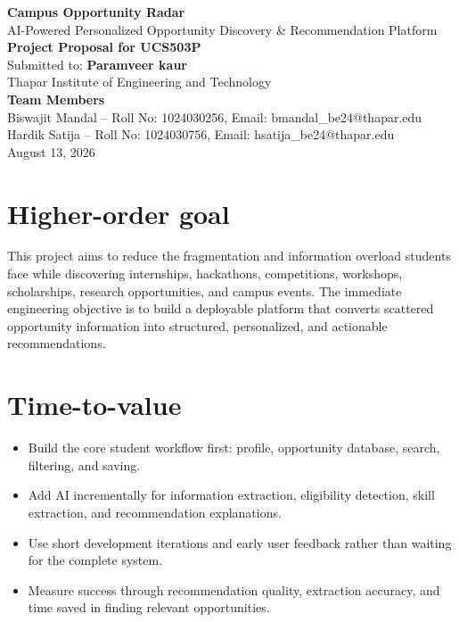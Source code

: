 \documentclass[11pt,a4paper]{article}
\begin{document}
\begin{center}
{\LARGE\bfseries Campus Opportunity Radar}\\[3pt]
{\large AI-Powered Personalized Opportunity Discovery \& Recommendation Platform}\\[6pt]
\textbf{Project Proposal for UCS503P}\\
Submitted to: \textbf{Paramveer kaur}\\
Thapar Institute of Engineering and Technology\\[6pt]
\textbf{Team Members}\\
Biswajit Mandal -- Roll No: 1024030256, Email: bmandal\_be24@thapar.edu\\
Hardik Satija -- Roll No: 1024030756, Email: hsatija\_be24@thapar.edu\\
[6pt]
August 13, 2026
\end{center}

\section{Higher-order goal}

This project aims to reduce the fragmentation and information overload students face while discovering internships, hackathons, competitions, workshops, scholarships, research opportunities, and campus events. The immediate engineering objective is to build a deployable platform that converts scattered opportunity information into structured, personalized, and actionable recommendations.

\section{Time-to-value}

\begin{itemize}
\item Build the core student workflow first: profile, opportunity database, search, filtering, and saving.
\item Add AI incrementally for information extraction, eligibility detection, skill extraction, and recommendation explanations.
\item Use short development iterations and early user feedback rather than waiting for the complete system.
\item Measure success through recommendation quality, extraction accuracy, and time saved in finding relevant opportunities.
\end{itemize}
\end{document}
